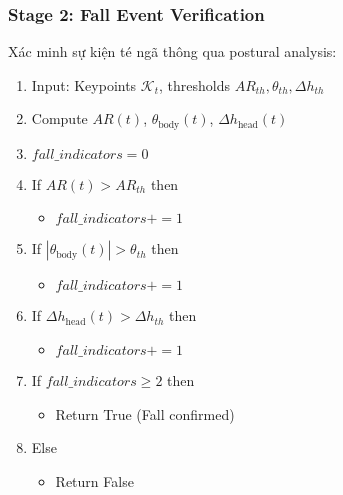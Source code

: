 \subsubsection{Stage 2: Fall Event Verification}
Xác minh sự kiện té ngã thông qua postural analysis:
\begin{enumerate}
\item Input: Keypoints $\mathcal{K}_t$, thresholds $AR_{th}, \theta_{th}, \Delta h_{th}$
\item Compute $AR(t)$, $\theta_{\text{body}}(t)$, $\Delta h_{\text{head}}(t)$
\item $fall\_indicators = 0$
\item If $AR(t) > AR_{th}$ then
\begin{itemize}
    \item $fall\_indicators += 1$
\end{itemize}
\item If $|\theta_{\text{body}}(t)| > \theta_{th}$ then
\begin{itemize}
    \item $fall\_indicators += 1$
\end{itemize}
\item If $\Delta h_{\text{head}}(t) > \Delta h_{th}$ then
\begin{itemize}
    \item $fall\_indicators += 1$
\end{itemize}
\item If $fall\_indicators \geq 2$ then
\begin{itemize}
    \item Return True (Fall confirmed)
\end{itemize}
\item Else
\begin{itemize}
    \item Return False
\end{itemize}
\end{enumerate}

